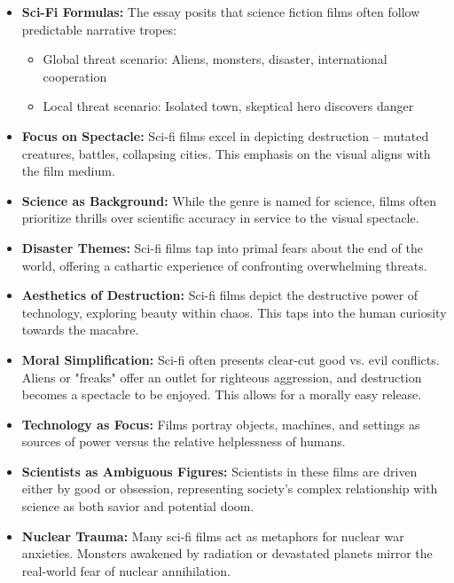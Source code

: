 \documentclass[11pt,fleqn]{book} %
\begin{document}
\begin{itemize}
\item \textbf{Sci-Fi Formulas:}  The essay posits that science fiction films often follow predictable narrative tropes:
    \begin{itemize}
        \item Global threat scenario: Aliens, monsters, disaster, international cooperation 
        \item Local threat scenario: Isolated town, skeptical hero discovers danger 
    \end{itemize}

\item \textbf{Focus on Spectacle:} Sci-fi films excel in depicting destruction – mutated creatures, battles, collapsing cities. This emphasis on the visual aligns with the film medium.

\item \textbf{Science as Background:} While the genre is named for science, films often prioritize thrills over scientific accuracy in service to the visual spectacle.

\item \textbf{Disaster Themes:}  Sci-fi films tap into primal fears about the end of the world,  offering a cathartic experience of confronting overwhelming threats. 

\item \textbf{Aesthetics of Destruction:} Sci-fi films depict the destructive power of  technology, exploring beauty within chaos. This taps into the human curiosity towards the macabre.

\item \textbf{Moral Simplification:}  Sci-fi often presents clear-cut good vs. evil conflicts.  Aliens or "freaks" offer an outlet for righteous aggression, and destruction becomes a spectacle to be enjoyed.  This allows for a morally easy release.

\item \textbf{Technology as Focus:}  Films portray objects, machines, and settings as sources of power versus the relative helplessness of humans. 

\item \textbf{Scientists as Ambiguous Figures:} Scientists in these films are driven either by good or obsession, representing society's complex relationship with science as both savior and potential doom.

\item \textbf{Nuclear Trauma:}  Many sci-fi films act as metaphors for nuclear war anxieties. Monsters awakened by radiation or devastated planets mirror the real-world fear of nuclear annihilation.


\end{itemize}
\end{document}
